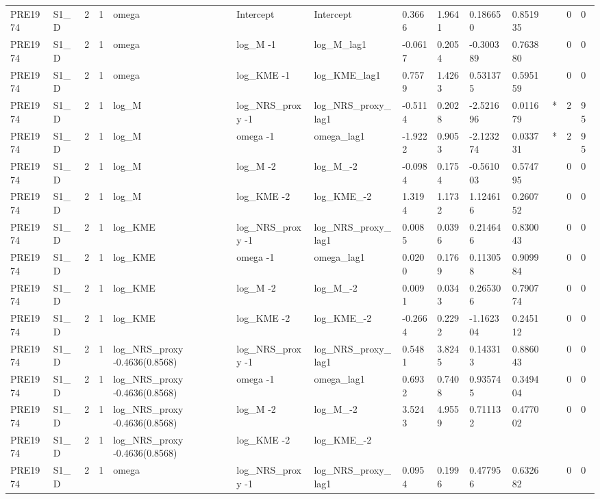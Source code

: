 \begin{tabular}{llllllllllllll}
PRE1974 & S1\_D & 2 & 1 & omega & Intercept & Intercept & 0.3666 & 1.9641 & 0.186650 & 0.851935 &  & 0 & 0 \\
PRE1974 & S1\_D & 2 & 1 & omega & log\_M -1 & log\_M\_lag1 & -0.0617 & 0.2054 & -0.300389 & 0.763880 &  & 0 & 0 \\
PRE1974 & S1\_D & 2 & 1 & omega & log\_KME -1 & log\_KME\_lag1 & 0.7579 & 1.4263 & 0.531375 & 0.595159 &  & 0 & 0 \\
PRE1974 & S1\_D & 2 & 1 & log\_M & log\_NRS\_proxy -1 & log\_NRS\_proxy\_lag1 & -0.5114 & 0.2028 & -2.521696 & 0.011679 & * & 2 & 95 \\
PRE1974 & S1\_D & 2 & 1 & log\_M & omega -1 & omega\_lag1 & -1.9222 & 0.9053 & -2.123274 & 0.033731 & * & 2 & 95 \\
PRE1974 & S1\_D & 2 & 1 & log\_M & log\_M -2 & log\_M\_-2 & -0.0984 & 0.1754 & -0.561003 & 0.574795 &  & 0 & 0 \\
PRE1974 & S1\_D & 2 & 1 & log\_M & log\_KME -2 & log\_KME\_-2 & 1.3194 & 1.1732 & 1.124616 & 0.260752 &  & 0 & 0 \\
PRE1974 & S1\_D & 2 & 1 & log\_KME & log\_NRS\_proxy -1 & log\_NRS\_proxy\_lag1 & 0.0085 & 0.0396 & 0.214646 & 0.830043 &  & 0 & 0 \\
PRE1974 & S1\_D & 2 & 1 & log\_KME & omega -1 & omega\_lag1 & 0.0200 & 0.1769 & 0.113058 & 0.909984 &  & 0 & 0 \\
PRE1974 & S1\_D & 2 & 1 & log\_KME & log\_M -2 & log\_M\_-2 & 0.0091 & 0.0343 & 0.265306 & 0.790774 &  & 0 & 0 \\
PRE1974 & S1\_D & 2 & 1 & log\_KME & log\_KME -2 & log\_KME\_-2 & -0.2664 & 0.2292 & -1.162304 & 0.245112 &  & 0 & 0 \\
PRE1974 & S1\_D & 2 & 1 & log\_NRS\_proxy -0.4636(0.8568) & log\_NRS\_proxy -1 & log\_NRS\_proxy\_lag1 & 0.5481 & 3.8245 & 0.143313 & 0.886043 &  & 0 & 0 \\
PRE1974 & S1\_D & 2 & 1 & log\_NRS\_proxy -0.4636(0.8568) & omega -1 & omega\_lag1 & 0.6932 & 0.7408 & 0.935745 & 0.349404 &  & 0 & 0 \\
PRE1974 & S1\_D & 2 & 1 & log\_NRS\_proxy -0.4636(0.8568) & log\_M -2 & log\_M\_-2 & 3.5243 & 4.9559 & 0.711132 & 0.477002 &  & 0 & 0 \\
PRE1974 & S1\_D & 2 & 1 & log\_NRS\_proxy -0.4636(0.8568) & log\_KME -2 & log\_KME\_-2 &  &  &  &  &  &  &  \\
PRE1974 & S1\_D & 2 & 1 & omega & log\_NRS\_proxy -1 & log\_NRS\_proxy\_lag1 & 0.0954 & 0.1996 & 0.477956 & 0.632682 &  & 0 & 0 \\

\end{tabular}
